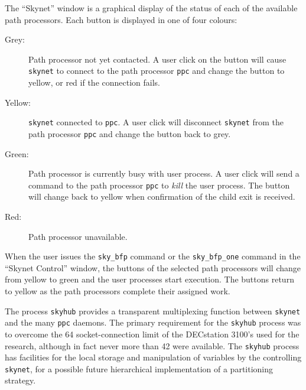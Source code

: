 The ``Skynet'' window is a graphical display of the status of each of the
available path processors.  Each button is displayed in one of four colours:
\begin{description}
\item[Grey: ]{Path processor not yet contacted.  A user click on the button will
    cause \texttt{skynet} to connect to the path processor \texttt{ppc} and change
    the button to yellow, or red if the connection fails.}
\item[Yellow: ]{\texttt{skynet} connected to \texttt{ppc}.  A user click will
    disconnect \texttt{skynet} from the path processor \texttt{ppc} and change the
    button back to grey.}
\item[Green: ]{Path processor is currently busy with user process.  A user click
    will send a command to the path processor \texttt{ppc} to
    \textit{kill} the user process.  The button will change back to yellow when
    confirmation of the child exit is received.}
\item[Red: ]{Path processor unavailable.}
\end{description}
When the user issues the \texttt{sky\_{}bfp} command or the \texttt{sky\_{}bfp\_{}one}
command in the ``Skynet Control'' window, the buttons of the selected path
processors will change from yellow to green and the user processes start
execution.  The buttons return to yellow as the path processors complete their
assigned work.

The process \texttt{skyhub} provides a transparent multiplexing function between
\texttt{skynet} and the many \texttt{ppc} daemons.  The primary requirement for
the \texttt{skyhub} process was to overcome the 64 socket-connection limit of
the DECstation 3100's used for the research, although in fact never more than
42 were available.  The \texttt{skyhub} process has facilities for the local
storage and manipulation of variables by the controlling \texttt{skynet}, for
a possible future hierarchical implementation of a partitioning strategy.

